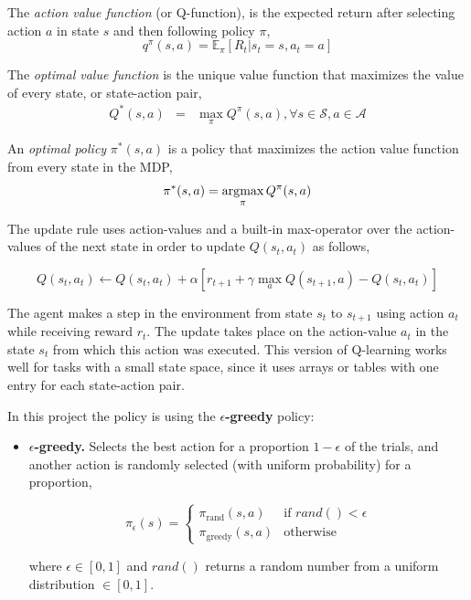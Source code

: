 The \emph{action value function} (or Q-function), is the expected return after selecting action $a$ in state $s$ and then following policy $\pi$,
%
\begin{equation}
q^\pi(s,a) = \mathbb{E}_\pi \left[ R_t | s_t = s, a_t = a \right]
\end{equation}

The \emph{optimal value function} is the unique value function that maximizes the value of every state, or state-action pair,
%
\begin{eqnarray}
Q^*(s,a) & = & \max\limits_\pi Q^\pi(s,a), \forall s \in \mathcal{S}, a \in \mathcal{A}
\end{eqnarray}

An \emph{optimal policy} $\pi^*(s,a)$ is a policy that maximizes the action value function from every state in the MDP,
%
\begin{equation}
    \pi^*(s,a) = \operatorname*{\arg\!\max}_\pi Q^\pi(s, a)
\end{equation}

The update rule uses action-values and a built-in max-operator over the action-values of the next state in order to update $Q(s_t, a_t)$ as follows,

\begin{equation}
Q(s_t,a_t) \gets Q(s_t,a_t) + \alpha \left[r_{t+1} + \gamma \max_a Q(s_{t+1},a) - Q(s_t,a_t)\right]
\end{equation}

The agent makes a step in the environment from state $s_t$ to $s_{t+1}$ using action $a_t$ while receiving reward $r_t$. The update takes place on the action-value $a_t$ in the state $s_t$ from which this action was executed. This version of Q-learning works well for tasks with a small state space, since it uses arrays or tables with one entry for each state-action pair.

In this project the policy is using the \textbf{$\epsilon$-greedy} policy:

\begin{itemize}

    \item \textbf{$\epsilon$-greedy.} Selects the best action for a proportion
        $1 - \epsilon$ of the trials, and another action is randomly selected (with
        uniform probability) for a proportion,
        
        \begin{equation}
            \pi_{\epsilon}(s) = \left\{
             \begin{array}{lr}
                 \pi_{\textrm{rand}}(s,a) & \text{if } rand() < \epsilon\\
                 \pi_{\textrm{greedy}}(s,a) & \text{otherwise}
             \end{array}
           \right.
        \end{equation}

        where $\epsilon \in [0, 1]$ and $rand()$ returns a random number from a uniform distribution $\in [0, 1]$.

\end{itemize}

